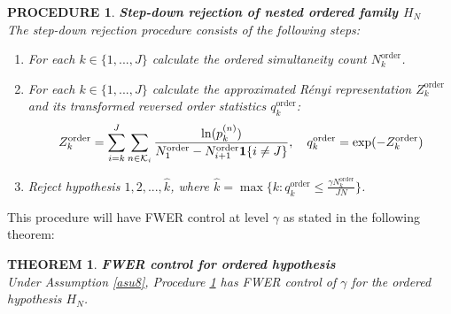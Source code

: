 \documentclass[11pt]{article}
\newcommand{\q}{\text{\quad}}
\newcommand{\oo}{\bm{1}}
\newtheorem{theorem}{THEOREM}
\newtheorem{procedure}{PROCEDURE}
\begin{document}
	\begin{procedure}{\bf Step-down rejection of nested ordered family $H_{N}$} \label{procedure:nested}\\
		The step-down rejection procedure consists of the following steps:
		\begin{enumerate}
			\item For each $k \in \{1,...,J\}$ calculate the ordered simultaneity count ${N}_k^{\text{order}}$.
			\item For each $k \in \{1,...,J\}$ calculate the approximated R\'enyi representation ${Z}_k^{\text{order}}$ and its transformed reversed order statistics ${q}_k^{\text{order}}$:
			\begin{equation}
				{Z}_k^{\text{order}}=\sum_{i=k}^J\sum_{n\in\mathcal{K}_i}
				\frac{ \ln(p^{(n)}_k) }{{N}_1^{\text{order}}-{N}^{\text{order}}_{i+1}\oo\{i\neq J\}}
				,\q {q}^{\text{order}}_k=\exp(-{Z}^{\text{order}}_k)
			\end{equation}
			\item Reject hypothesis $1,2,...,\hat{k}$, where $\hat{k}=\max\{k:{q}^{\text{order}}_k\leq\frac{\gamma {N}^{\text{order}}_k}{JN}\}$.
		\end{enumerate}
	\end{procedure}
	This procedure will have FWER control at level $\gamma$ as stated in the following theorem:
	
	\begin{theorem}{\bf FWER control for ordered hypothesis}\label{thm4}\\
		Under Assumption \ref{asu8}, Procedure \ref{procedure:nested} has FWER control of $\gamma$ for the ordered hypothesis $H_{N}$.
	\end{theorem}
	
\end{document}
